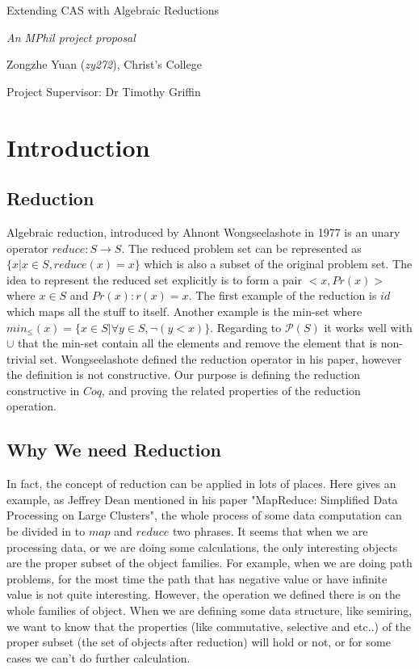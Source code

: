 \documentclass[11pt]{article}
\begin{document}
\centerline{\Large Extending CAS with Algebraic Reductions}
\vspace{2em}
\centerline{\Large \emph{An MPhil project proposal}}
\vspace{2em}
\centerline{\large Zongzhe Yuan (\emph{zy272}), Christ's College}
\vspace{1em}
\centerline{\large Project Supervisor: Dr Timothy Griffin}
\vspace{1em}

\section{Introduction}
\subsection{Reduction}
Algebraic reduction, introduced by Ahnont Wongseelashote in 1977\cite{WONGSEELASHOTE197955} is an unary operator $reduce : S \longrightarrow S$. The reduced problem set can be represented as $\{x | x \in S, reduce(x) = x\}$ which is also a subset of the original problem set. The idea to represent the reduced set explicitly is to form a pair $<x,Pr(x)>$ where $x \in S$ and $Pr(x) : r(x) = x$. The first example of the reduction is $id$ which maps all the stuff to itself. Another example is the min-set where $min_\leq(x) = \{x \in S | \forall y \in S, \neg(y < x)\}$. Regarding to $\mathcal{P}(S)$ it works well with $\cup$ that the min-set contain all the elements and remove the element that is non-trivial set. Wongseelashote defined the reduction operator in his paper, however the definition is not constructive. Our purpose is defining the reduction constructive in $Coq$, and proving the related properties of the reduction operation.
\subsection{Why We need Reduction}
In fact, the concept of reduction can be applied in lots of places. Here gives an example, as Jeffrey Dean mentioned in his paper "MapReduce: Simplified Data Processing on Large Clusters", the whole process of some data computation can be divided in to $map$ and $reduce$ two phrases. It seems that when we are processing data, or we are doing some calculations, the only interesting objects are the proper subset of the object families. For example, when we are doing path problems, for the most time the path that has negative value or have infinite value is not quite interesting. However, the operation we defined there is on the whole families of object. When we are defining some data structure, like semiring, we want to know that the properties (like commutative, selective and etc..) of the proper subset (the set of objects after reduction) will hold or not, or for some cases we can't do further calculation.
\end{document}
